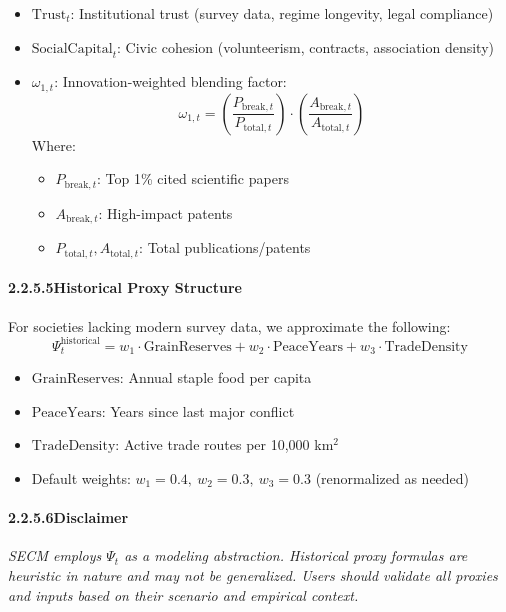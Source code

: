 \documentclass[12pt]{report}
\begin{document}
\begin{itemize}
  \item $\text{Trust}_t$: Institutional trust (survey data, regime longevity, legal compliance)
  \item $\text{SocialCapital}_t$: Civic cohesion (volunteerism, contracts, association density)
  \item $\omega_{1,t}$: Innovation-weighted blending factor:
  \[
  \omega_{1,t} = \left( \frac{P_{\text{break},t}}{P_{\text{total},t}} \right) \cdot \left( \frac{A_{\text{break},t}}{A_{\text{total},t}} \right)
  \]
  Where:
  \begin{itemize}
    \item $P_{\text{break},t}$: Top 1\% cited scientific papers
    \item $A_{\text{break},t}$: High-impact patents
    \item $P_{\text{total},t}, A_{\text{total},t}$: Total publications/patents
  \end{itemize}
\end{itemize}

\paragraph{2.2.5.5\quad Historical Proxy Structure}

For societies lacking modern survey data, we approximate the following:
\[
\Psi_t^{\text{historical}} = w_1 \cdot \text{GrainReserves} + w_2 \cdot \text{PeaceYears} + w_3 \cdot \text{TradeDensity}
\]

\begin{itemize}
  \item $\text{GrainReserves}$: Annual staple food per capita
  \item $\text{PeaceYears}$: Years since last major conflict
  \item $\text{TradeDensity}$: Active trade routes per 10,000 km$^2$
  \item Default weights: $w_1 = 0.4,\ w_2 = 0.3,\ w_3 = 0.3$ (renormalized as needed)
\end{itemize}

\paragraph{2.2.5.6\quad Disclaimer}

\textit{SECM employs $\Psi_t$ as a modeling abstraction. Historical proxy formulas are heuristic in nature and may not be generalized. Users should validate all proxies and inputs based on their scenario and empirical context.}
\end{document}
